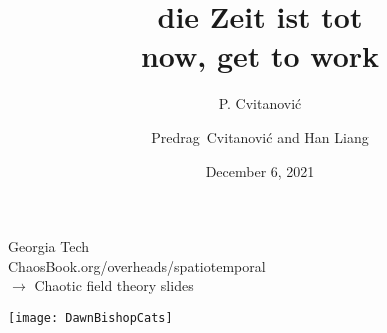 

                        \newif\ifboyscout\boyscouttrue          %
                        \newif\ifsubmission\submissionfalse     %
                        \newif\ifblog\blogfalse %


\usepackage[font=scriptsize, labelfont=bf]{caption}
\usepackage[
    backend=biber,  %
    sorting=nyt,
    style=numeric, %
    natbib=true,
    style=phys, %
    biblabel= brackets, %
    articletitle=false, %
    pageranges = true , %
    sortlocale=en_US,
    firstinits=true,
    url=false, %
    doi=false, %
    eprint=false
]{biblatex}



\renewcommand{\Ssym}[1]{{\ensuremath{m_{#1}}}}    %


\title{
{\huge die Zeit ist tot} %
    \\
{now, get to work}
}
\author{P. Cvitanovi\'c}
\author[Cvitanovi\'c]
{
  \textcolor{green!50!black}{
  {Predrag~Cvitanovi\'c
   and
   Han Liang
  }	%
  }
}
\institute
{               Georgia Tech     \\
                {\scriptsize
 ChaosBook.org/overheads/spatiotemporal \\
 $\to$ Chaotic field theory slides    }
 }
\date{December 6, 2021}

\begin{frame}{} %
\begin{center}
\hfill\texttt{[image: DawnBishopCats]}
\end{center}
\end{frame} %

